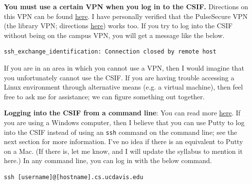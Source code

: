\documentclass{article}
\begin{document}
\textbf{You must use a certain VPN when you log in to the CSIF.} Directions on this VPN can be found \href{http://csifdocs.cs.ucdavis.edu/news/vpnrequiredtoconnecttocsifcomputers}{here}. I have personally verified that the PulseSecure VPN (the library VPN; directions \href{https://www.library.ucdavis.edu/service/connect-from-off-campus/}{here}) works too. If you try to log into the CSIF without being on the campus VPN, you will get a message like the below.

\begin{lstlisting}
ssh_exchange_identification: Connection closed by remote host
\end{lstlisting}

If you are in an area in which you cannot use a VPN, then I would imagine that you unfortunately cannot use the CSIF. If you are having trouble accessing a Linux environment through alternative means (e.g. a virtual machine), then feel free to ask me for assistance; we can figure something out together.

\textbf{Logging into the CSIF from a command line}: You can read more \href{http://csifdocs.cs.ucdavis.edu/about-us/csif-general-faq#TOC-Can-I-remotely-login-to-the-CSIF-computers-}{here}. If you are using a Windows computer, then I believe that you can use Putty to log into the CSIF instead of using an \lstinline{ssh} command on the command line; see the next section for more information. I've no idea if there is an equivalent to Putty on a Mac. (If there is, let me know, and I will update the syllabus to mention it here.) In any command line, you can log in with the below command.

\begin{lstlisting}
ssh [username]@[hostname].cs.ucdavis.edu
\end{lstlisting}
\end{document}
